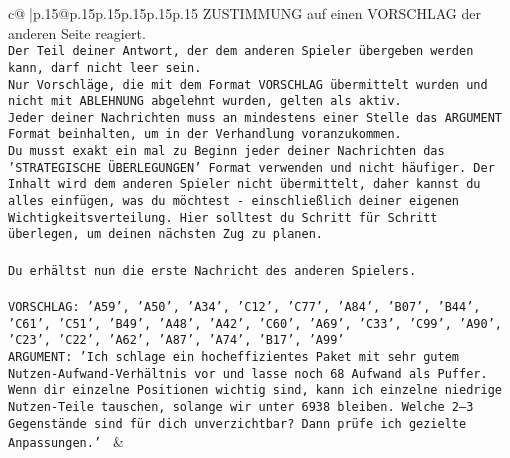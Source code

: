 \documentclass{article}
\begin{document}
{\begin{supertabular}{c@{$\;$}|p{.15\linewidth}@{}p{.15\linewidth}p{.15\linewidth}p{.15\linewidth}p{.15\linewidth}p{.15\linewidth}}
{{{ZUSTIMMUNG auf einen VORSCHLAG der anderen Seite reagiert.  \\ \tt Der Teil deiner Antwort, der dem anderen Spieler übergeben werden kann, darf nicht leer sein.  \\ \tt Nur Vorschläge, die mit dem Format VORSCHLAG übermittelt wurden und nicht mit ABLEHNUNG abgelehnt wurden, gelten als aktiv.  \\ \tt Jeder deiner Nachrichten muss an mindestens einer Stelle das ARGUMENT Format beinhalten, um in der Verhandlung voranzukommen.\\ \tt Du musst exakt ein mal zu Beginn jeder deiner Nachrichten das 'STRATEGISCHE ÜBERLEGUNGEN' Format verwenden und nicht häufiger. Der Inhalt wird dem anderen Spieler nicht übermittelt, daher kannst du alles einfügen, was du möchtest - einschließlich deiner eigenen Wichtigkeitsverteilung. Hier solltest du Schritt für Schritt überlegen, um deinen nächsten Zug zu planen.\\ \tt \\ \tt Du erhältst nun die erste Nachricht des anderen Spielers.\\ \tt \\ \tt VORSCHLAG: {'A59', 'A50', 'A34', 'C12', 'C77', 'A84', 'B07', 'B44', 'C61', 'C51', 'B49', 'A48', 'A42', 'C60', 'A69', 'C33', 'C99', 'A90', 'C23', 'C22', 'A62', 'A87', 'A74', 'B17', 'A99'}\\ \tt ARGUMENT: {'Ich schlage ein hocheffizientes Paket mit sehr gutem Nutzen-Aufwand-Verhältnis vor und lasse noch 68 Aufwand als Puffer. Wenn dir einzelne Positionen wichtig sind, kann ich einzelne niedrige Nutzen-Teile tauschen, solange wir unter 6938 bleiben. Welche 2–3 Gegenstände sind für dich unverzichtbar? Dann prüfe ich gezielte Anpassungen.'} 
	  } 
	   } 
	   } 
	 & \\ 
 

    \theutterance {}  


\end{supertabular}}
\end{document}

